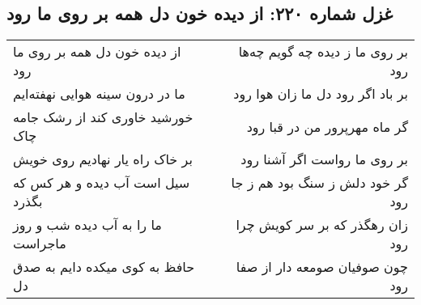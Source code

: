 \begin{center}
\section*{غزل شماره ۲۲۰: از دیده خون دل همه بر روی ما رود}
\label{sec:sh220}
\begin{longtable}{l p{0.5cm} r}
از دیده خون دل همه بر روی ما رود
&&
بر روی ما ز دیده چه گویم چه‌ها رود
\\
ما در درون سینه هوایی نهفته‌ایم
&&
بر باد اگر رود دل ما زان هوا رود
\\
خورشید خاوری کند از رشک جامه چاک
&&
گر ماه مهرپرور من در قبا رود
\\
بر خاک راه یار نهادیم روی خویش
&&
بر روی ما رواست اگر آشنا رود
\\
سیل است آب دیده و هر کس که بگذرد
&&
گر خود دلش ز سنگ بود هم ز جا رود
\\
ما را به آب دیده شب و روز ماجراست
&&
زان رهگذر که بر سر کویش چرا رود
\\
حافظ به کوی میکده دایم به صدق دل
&&
چون صوفیان صومعه دار از صفا رود
\\
\end{longtable}
\end{center}
